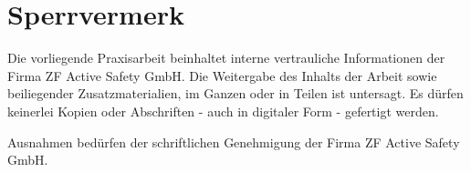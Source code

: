 \documentclass[Thesis.tex]{subfiles}
\begin{document}
\section*{Sperrvermerk}
Die vorliegende Praxisarbeit beinhaltet interne vertrauliche Informationen der Firma ZF Active Safety GmbH.
Die Weitergabe des Inhalts der Arbeit sowie beiliegender Zusatzmaterialien, im Ganzen oder in Teilen ist untersagt.
Es dürfen keinerlei Kopien oder Abschriften - auch in digitaler Form - gefertigt werden.

Ausnahmen bedürfen der schriftlichen Genehmigung der Firma ZF Active Safety GmbH.
\end{document}

